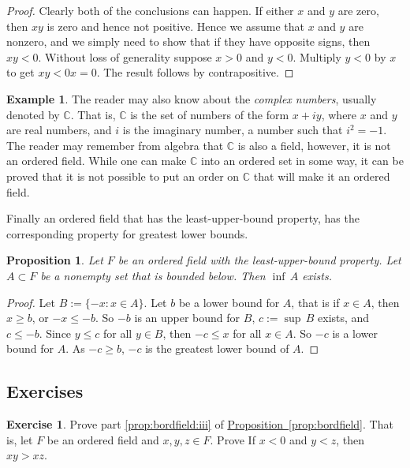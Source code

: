 \documentclass[12pt]{book}
\newcommand{\C}{{\mathbb{C}}}
\newcommand{\myindex}[1]{#1\index{#1}}
\theoremstyle{plain}
\newtheorem{prop}[thm]{Proposition}
\theoremstyle{remark}
\theoremstyle{definition}
\theoremstyle{exercise}
\newtheorem{exercise}{Exercise}[section]
\theoremstyle{example}
\newtheorem{example}[thm]{Example}
\newcommand{\propref}[1]{\hyperref[#1]{Proposition~\ref*{#1}}}
\begin{document}
\begin{proof}
Clearly both of the conclusions can happen.  If either
$x$ and $y$ are zero, then $xy$ is zero and hence not positive.
Hence we assume that $x$ and $y$ are nonzero,
and we simply need to show that if they have opposite signs, then
$xy < 0$.
Without loss of
generality suppose $x > 0$ and $y < 0$.  Multiply $y < 0$ by $x$ to get
$xy < 0x = 0$.  The result follows by contrapositive.
\end{proof}

\begin{example} \label{example:complexfield}
The reader may also know about the \emph{\myindex{complex numbers}},
usually denoted by
$\C$.  That is, $\C$ is the set of numbers of
the form $x + iy$, where $x$ and $y$ are real numbers, and $i$ is the
imaginary number, a number such that $i^2 = -1$.  The reader may
remember from algebra that $\C$ is also a field, however, it is not an
ordered field.  While one can make $\C$ into an ordered set in some way,
it can be proved that it is not possible to put an
order on $\C$ that will make it an ordered field.
\end{example}

Finally an ordered field that has the least-upper-bound property, has the
corresponding property for greatest lower bounds.

\begin{prop}
Let $F$ be an ordered field with the least-upper-bound property.
Let $A \subset F$ be a nonempty set that is bounded below.
Then $\inf\, A$ exists.
\end{prop}

\begin{proof}
Let $B := \{ -x : x \in A \}$. Let $b$ be a lower bound for $A$,
that is if $x \in A$, then $x \geq b$, or $-x \leq -b$.  So $-b$
is an upper bound for $B$, $c:=\sup\, B$ exists, and $c \leq -b$.
Since $y \leq c$
for all $y \in B$, then $-c \leq x$ for all $x \in A$.
So
$-c$ is a lower bound for $A$.  As $-c \geq b$,
$-c$ is the greatest lower bound of $A$.
\end{proof}

\subsection{Exercises}

\begin{exercise}
Prove part \ref{prop:bordfield:iii} of \propref{prop:bordfield}.
That is, let $F$ be an ordered field and $x,y,z \in F$.  Prove
If $x < 0$ and $y < z$, then $xy > xz$.
\end{exercise}
\end{document}
